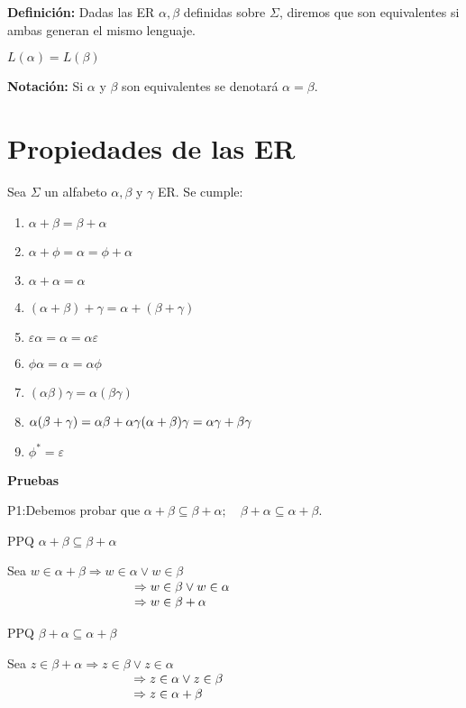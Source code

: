 \textbf{Definición: }Dadas las ER $\alpha,\beta$ definidas sobre $\Sigma$, diremos que son equivalentes si ambas generan el mismo lenguaje.

$L(\alpha)=L(\beta)$

\textbf{Notación: }Si $\alpha$ y $\beta$ son equivalentes se denotará $\alpha =\beta$.
\section{Propiedades de las ER}

Sea $\Sigma$ un alfabeto $\alpha,\beta$ y $\gamma$ ER. Se cumple:
\begin{enumerate}
\item $\alpha+\beta=\beta+\alpha$
\item $\alpha+\phi=\alpha=\phi+\alpha$
\item $\alpha+\alpha=\alpha$
\item $(\alpha+\beta)+\gamma=\alpha+(\beta+\gamma)$
\item $\varepsilon \alpha =\alpha=\alpha \varepsilon$
\item $\phi \alpha=\alpha=\alpha\phi$
\item $(\alpha \beta)\gamma= \alpha (\beta \gamma)$ %
\item $\alpha(\beta+\gamma)=\alpha \beta+\alpha \gamma\\
(\alpha+\beta) \gamma =\alpha\gamma+\beta\gamma$
\item $\phi^* =\varepsilon$
\end{enumerate}

\textbf{Pruebas}

P1:Debemos probar que $\alpha+\beta\subseteq\beta+\alpha; \quad \beta+\alpha\subseteq\alpha+\beta$. 

PPQ $\alpha+\beta\subseteq\beta+\alpha$

Sea $ w\in\alpha+\beta \Rightarrow w\in \alpha \lor w\in\beta$\\
$\begin{array}{p{3cm}l}
					& \Rightarrow w\in\beta \lor w\in\alpha \\ 
					& \Rightarrow w\in \beta +\alpha
					\end{array}$
					
PPQ $\beta+\alpha\subseteq\alpha+\beta$

Sea $z\in \beta+\alpha  \Rightarrow z\in\beta \lor z\in\alpha$\\
$\begin{array}{p{3cm}l}
			& \Rightarrow z\in \alpha \lor z\in \beta \\
			& \Rightarrow z\in\alpha+\beta
\end{array}$

